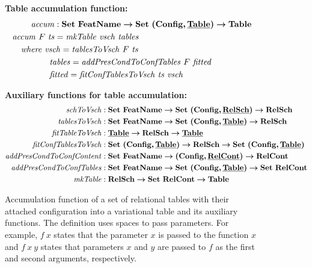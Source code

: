\begin{figure}

\textbf{Table accumulation function:}
\begin{alignat*}{1}
\mathit{accum} &: \settype \fSet \totype \settype {\typepair \confSet \pTabSet} \totype \tabletype\\
\mathit{accum} \  \features \ \mathit{ts} &= \mathit{mkTable} \ \mathit{vsch} \ \mathit{tables}\\
&\hspace{-40pt}\textit{where }
\mathit{vsch} = \mathit{tablesToVsch} \ \features \ \mathit{ts}\\
&\hspace{-6pt} \mathit{tables} = \mathit{addPresCondToConfTables} \ \features \ \mathit {fitted}\\
&\hspace{-6pt} \mathit{fitted} = \mathit{fitConfTablesToVsch} \ \mathit{ts} \ \mathit{vsch}
\end{alignat*}


\medskip 
\textbf{Auxiliary functions for table accumulation:}
\footnotesize
\begin{alignat*}{1}
\mathit{schToVsch} &: \settype \fSet \totype \settype {\typepair \confSet \pRelSchSet} \totype \vRelSchSet\\
\mathit{tablesToVsch} &: \settype \fSet \totype \settype {\typepair \confSet \pTabSet} \totype \vRelSchSet\\
\mathit{fitTableToVsch} &: \pTabSet \totype \vRelSchSet \totype \pTabSet\\
\mathit{fitConfTablesToVsch} &: \settype {\typepair \confSet \pTabSet} \totype \vRelSchSet \totype \settype {\typepair \confSet \pTabSet}\\
\mathit{addPresCondToConfContent} &: \settype \fSet \totype \typepair \confSet \pRelContSet \totype \vRelContSet\\
\mathit{addPresCondToConfTables} &: \settype \fSet \totype \settype {\typepair \confSet \pTabSet} \totype \settype \vRelContSet\\
\mathit{mkTable} &: \vRelSchSet \totype \settype \vRelContSet \totype \tabletype
\end{alignat*}


\caption[Accumulation function of a set of relational tables with their attached configuration into a variational table]{Accumulation function of a set of relational tables with their attached configuration into a variational table and its auxiliary functions. The definition uses spaces to pass parameters. For example, $f \ x$ states that the parameter $x$ is passed to the function $x$ and $f\ x\ y$ states that
parameters $x$ and $y$ are passed to $f$ as the first and second arguments, respectively.
}
\label{fig:accum1}
\end{figure}

